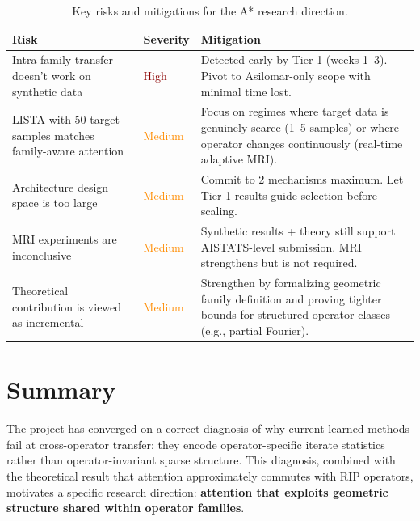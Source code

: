 \documentclass[11pt]{article}
\begin{document}
\begin{table}[h]
\centering
\caption{Key risks and mitigations for the A* research direction.}
\vspace{4pt}
\begin{tabular}{>{\raggedright\arraybackslash}p{4cm}
                >{\raggedright\arraybackslash}p{3cm}
                >{\raggedright\arraybackslash}p{5cm}}
\toprule
\textbf{Risk} & \textbf{Severity} & \textbf{Mitigation} \\
\midrule
Intra-family transfer doesn't work on synthetic data &
\textcolor{darkred}{High} &
Detected early by Tier 1 (weeks 1--3). Pivot to Asilomar-only
scope with minimal time lost. \\[6pt]

LISTA with 50 target samples matches family-aware attention &
\textcolor{darkorange}{Medium} &
Focus on regimes where target data is genuinely scarce
(1--5 samples) or where operator changes continuously
(real-time adaptive MRI). \\[6pt]

Architecture design space is too large &
\textcolor{darkorange}{Medium} &
Commit to 2 mechanisms maximum. Let Tier 1 results guide
selection before scaling. \\[6pt]

MRI experiments are inconclusive &
\textcolor{darkorange}{Medium} &
Synthetic results + theory still support AISTATS-level
submission. MRI strengthens but is not required. \\[6pt]

Theoretical contribution is viewed as incremental &
\textcolor{darkorange}{Medium} &
Strengthen by formalizing geometric family definition and
proving tighter bounds for structured operator classes
(e.g., partial Fourier). \\
\bottomrule
\end{tabular}
\end{table}

\section{Summary}
\label{sec:summary}

The project has converged on a correct diagnosis of why current
learned methods fail at cross-operator transfer: they encode
operator-specific iterate statistics rather than
operator-invariant sparse structure.
This diagnosis, combined with the theoretical result that attention
approximately commutes with RIP operators, motivates a specific
research direction: \textbf{attention that exploits geometric
structure shared within operator families}.
\end{document}
